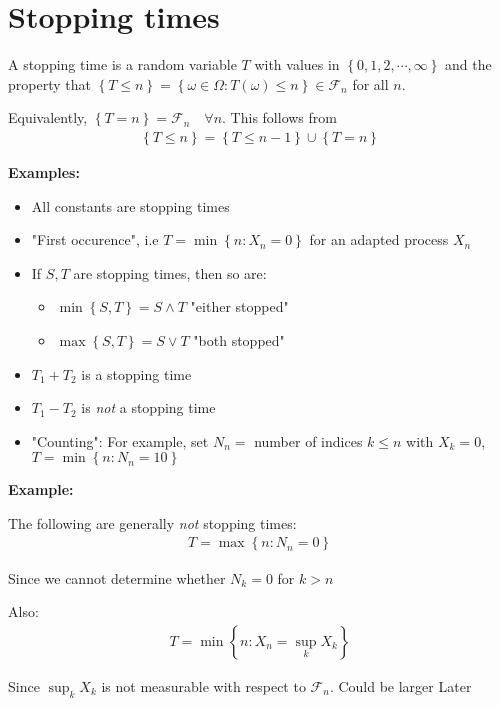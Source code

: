 \section{Stopping times}
A stopping time is a random variable $T$ with values in $\left\{0,1,2,\cdots,\infty\right\}$ and the property that $\left\{T\leq n\right\} = \left\{\omega\in\Omega:T(\omega)\leq n\right\}\in\mathcal{F}_n$ for all $n$.\par
\noindent Equivalently, $\left\{T=n\right\} = \mathcal{F}_n \quad\forall n$. This follows from
\begin{equation*}
  \begin{gathered}
  \left\{T\leq n\right\} = \left\{T\leq n-1\right\}\cup \left\{T=n\right\}
  \end{gathered}
\end{equation*}
\par\bigskip
\noindent\textbf{Examples:}
\begin{itemize}
  \item All constants are stopping times
  \item "First occurence", i.e $T = \min\left\{n:X_n=0\right\}$ for an adapted process $X_n$
  \item  If $S,T$ are stopping times, then so are:
    \begin{itemize}
      \item $\min\left\{S,T\right\} = S\wedge T$ "either stopped"
      \item $\max\left\{S,T\right\} = S\vee T$ "both stopped"
    \end{itemize}
  \item $T_1+T_2$ is a stopping time
  \item $T_1-T_2$ is \textit{not} a stopping time
  \item "Counting": For example, set $N_n = $  number of indices $k\leq n$ with $X_k=0$, $T=\min\left\{n:N_n=10\right\}$
\end{itemize}
\par\bigskip
\noindent\textbf{Example:}\par
\noindent The following are generally \textit{not} stopping times:
\begin{equation*}
  \begin{gathered}
  T = \max\left\{n:N_n=0\right\} 
  \end{gathered}
\end{equation*}\par
\noindent Since we cannot determine whether $N_k = 0$ for $k>n$
\par\bigskip
\noindent Also:
\begin{equation*}
  \begin{gathered}
  T = \min\left\{n:X_n = \sup_k X_k\right\}
  \end{gathered}
\end{equation*}\par
\noindent Since $\sup_k X_k$ is not measurable with respect to $\mathcal{F}_n$. Could be larger Later
\par\bigskip
